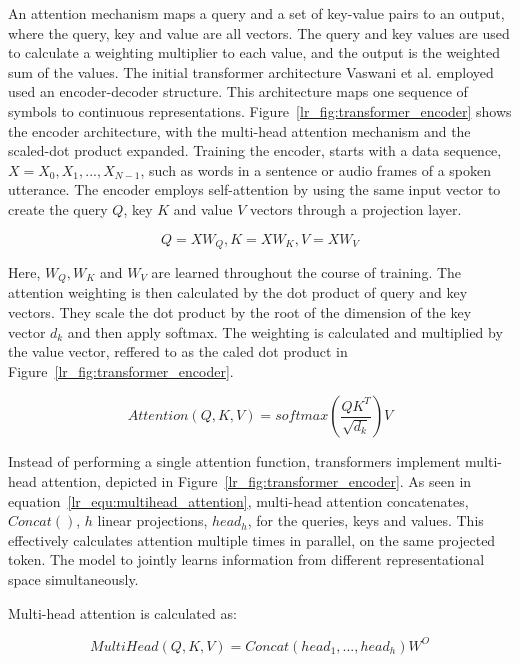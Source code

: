 An attention mechanism maps a query and a set of key-value pairs to an output, where the query, key and value are all vectors. The query and key values are used to calculate a weighting multiplier to each value, and the output is the weighted sum of the values. The initial transformer architecture Vaswani et al. \cite{vaswani2017attention} employed used an encoder-decoder structure. This architecture maps one sequence of symbols to continuous representations. Figure~\ref{lr_fig:transformer_encoder} shows the encoder architecture, with the multi-head attention mechanism and the scaled-dot product expanded. Training the encoder, starts with a data sequence, $X = X_0, X_1,...,X_{N-1}$, such as words in a sentence or audio frames of a spoken utterance. The encoder employs self-attention by using the same input vector to create the query $Q$, key $K$ and value $V$ vectors through a projection layer. 

\begin{equation}
    Q=XW_Q, K=XW_K, V=XW_V
\end{equation}

Here, $W_Q, W_K$ and $W_V$ are learned throughout the course of training. The attention weighting is then calculated by the dot product of query and key vectors. They scale the dot product by the root of the dimension of the key vector $d_k$ and then apply softmax. The weighting is calculated and multiplied by the value vector, reffered to as the caled dot product in Figure~\ref{lr_fig:transformer_encoder}. 

\begin{equation}
    Attention(Q,K,V)=softmax(\frac{QK^T}{\sqrt{d_k}})V
\end{equation}

Instead of performing a single attention function, transformers implement multi-head attention, depicted in Figure~\ref{lr_fig:transformer_encoder}. As seen in equation~\ref{lr_equ:multihead_attention}, multi-head attention concatenates, $Concat()$, $h$ linear projections, $head_h$, for the queries, keys and values. This effectively calculates attention multiple times in parallel, on the same projected token. The model to jointly learns information from different representational space simultaneously. 

Multi-head attention is calculated as:

\begin{equation}
    MultiHead(Q,K,V)=Concat(head_1,...,head_h)W^O
\end{equation}\label{lr_equ:multihead_attention}

